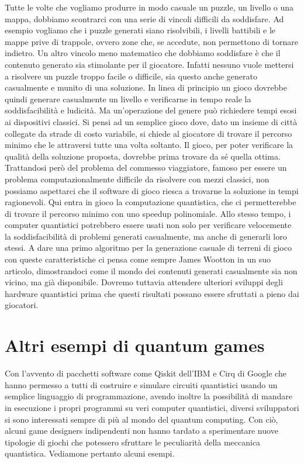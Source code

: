 \documentclass{book}
\theoremstyle{definition}
\theoremstyle{definition}
\theoremstyle{definition}
\theoremstyle{plain}
\theoremstyle{plain}
\theoremstyle{plain}
\theoremstyle{plain}
\begin{document}
Tutte le volte che vogliamo produrre in modo casuale un puzzle, un livello o una mappa, dobbiamo scontrarci con una serie di vincoli difficili da soddisfare. Ad esempio vogliamo che i puzzle generati siano risolvibili, i livelli battibili e le mappe prive di trappole, ovvero zone che, se accedute, non permettono di tornare indietro. Un altro vincolo meno matematico che dobbiamo soddisfare è che il contenuto generato sia stimolante per il giocatore. Infatti nessuno vuole mettersi a risolvere un puzzle troppo facile o difficile, sia questo anche generato casualmente e munito di una soluzione. In linea di principio un gioco dovrebbe quindi generare casualmente un livello e verificarne in tempo reale la soddisfacibilità e ludicità. Ma un'operazione del genere può richiedere tempi esosi ai dispositivi classici. Si pensi ad un semplice gioco dove, dato un insieme di città collegate da strade di costo variabile, si chiede al giocatore di trovare il percorso minimo che le attraversi tutte una volta soltanto. Il gioco, per poter verificare la qualità della soluzione proposta, dovrebbe prima trovare da sé quella ottima. Trattandosi però del problema del commesso viaggiatore, famoso per essere un problema computazionalmente difficile da risolvere con mezzi classici, non possiamo aspettarci che il software di gioco riesca a trovarne la soluzione in tempi ragionevoli. Qui entra in gioco la computazione quantistica, che ci permetterebbe di trovare il percorso minimo con uno speedup polinomiale. Allo stesso tempo, i computer quantistici potrebbero essere usati non solo per verificare velocemente la soddisfacibilità di problemi generati casualmente, ma anche di generarli loro stessi. A dare una primo algoritmo per la generazione casuale di terreni di gioco con queste caratteristiche ci pensa come sempre James Wootton in un suo articolo\cite{wootton_random_world}, dimostrandoci come il mondo dei contenuti generati casualmente sia non vicino, ma già disponibile. Dovremo tuttavia attendere ulteriori sviluppi degli hardware quantistici prima che questi risultati possano essere sfruttati a pieno dai giocatori.

\section{Altri esempi di quantum games}
Con l'avvento di pacchetti software come Qiskit dell'IBM e Cirq di Google che hanno permesso a tutti di costruire e simulare circuiti quantistici usando un semplice linguaggio di programmazione, avendo inoltre la possibilità di mandare in esecuzione i propri programmi su veri computer quantistici, diversi sviluppatori si sono interessati sempre di più al mondo del quantum computing. Con ciò, alcuni game designers indipendenti non hanno tardato a sperimentare nuove tipologie di giochi che potessero sfruttare le peculiarità della meccanica quantistica. Vediamone pertanto alcuni esempi.
\end{document}
